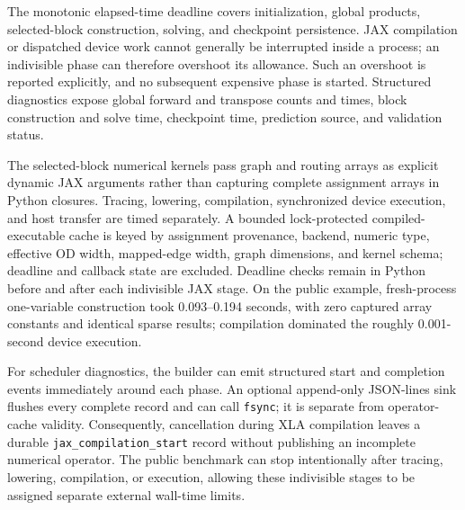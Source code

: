 The monotonic elapsed-time deadline covers initialization, global products,
selected-block construction, solving, and checkpoint persistence.  JAX
compilation or dispatched device work cannot generally be interrupted inside a
process; an indivisible phase can therefore overshoot its allowance.  Such an
overshoot is reported explicitly, and no subsequent expensive phase is started.
Structured diagnostics expose global forward and transpose counts and times,
block construction and solve time, checkpoint time, prediction source, and
validation status.

The selected-block numerical kernels pass graph and routing arrays as explicit
dynamic JAX arguments rather than capturing complete assignment arrays in
Python closures.  Tracing, lowering, compilation, synchronized device
execution, and host transfer are timed separately.  A bounded lock-protected
compiled-executable cache is keyed by assignment provenance, backend, numeric
type, effective OD width, mapped-edge width, graph dimensions, and kernel schema;
deadline and callback state are excluded.  Deadline checks remain in Python
before and after each indivisible JAX stage.  On the public example,
fresh-process one-variable construction took 0.093--0.194 seconds, with zero
captured array constants and identical sparse results; compilation dominated
the roughly 0.001-second device execution.

For scheduler diagnostics, the builder can emit structured start and completion
events immediately around each phase.  An optional append-only JSON-lines sink
flushes every complete record and can call \texttt{fsync}; it is separate from
operator-cache validity.  Consequently, cancellation during XLA compilation
leaves a durable \texttt{jax\_compilation\_start} record without publishing an
incomplete numerical operator.  The public benchmark can stop intentionally
after tracing, lowering, compilation, or execution, allowing these indivisible
stages to be assigned separate external wall-time limits.

